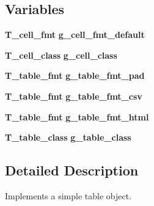\subsection*{Variables}
\begin{CompactItemize}
\item 
{\bf T\_\-cell\_\-fmt} {\bf g\_\-cell\_\-fmt\_\-default}
\item 
{\bf T\_\-cell\_\-class} {\bf g\_\-cell\_\-class}
\item 
{\bf T\_\-table\_\-fmt} {\bf g\_\-table\_\-fmt\_\-pad}
\item 
{\bf T\_\-table\_\-fmt} {\bf g\_\-table\_\-fmt\_\-csv}
\item 
{\bf T\_\-table\_\-fmt} {\bf g\_\-table\_\-fmt\_\-html}
\item 
{\bf T\_\-table\_\-class} {\bf g\_\-table\_\-class}
\end{CompactItemize}


\subsection{Detailed Description}
Implements a simple table object.



